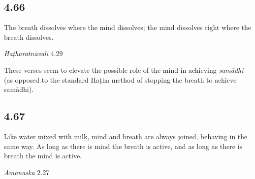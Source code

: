 \begin{ekdosis}
\subsection*{4.66}
\begin{translation}[hp04_066]
The breath dissolves where the mind dissolves; the mind dissolves right where the breath dissolves.
\end{translation}


\begin{testimonia}[hp04_066]
\emph{Haṭharatnāvalī} 4.29
\begin{versinnote}
\end{versinnote}
\end{testimonia}

\begin{philcomm}[hp04_066]
These verses seem to elevate the possible role of the mind in achieving \emph{samādhi} (as opposed to the standard Haṭha method of stopping the breath to achieve samādhi).

\end{philcomm}

\subsection*{4.67}
\begin{translation}[hp04_067]
 Like water mixed with milk, mind and breath are always joined, behaving in the same way.  As long as there is mind the breath is active, and as long as there is breath the mind is active.
\end{translation}


\begin{sources}[hp04_067]
\emph{Amanaska} 2.27
\begin{versinnote}
\tl{\var{sadaiva ] NI, S, N : tathaiva Cc : sad eva Na}\\!}
\end{versinnote}
\end{sources}


\end{ekdosis}

